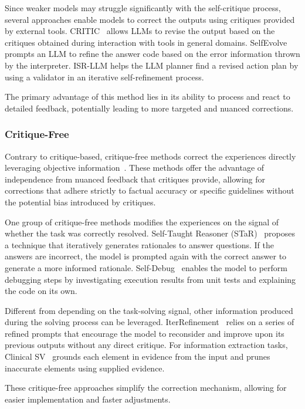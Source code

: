 \documentclass[sn-basic, Numbered]{sn-jnl}%
\theoremstyle{thmstyleone}%
\theoremstyle{thmstyletwo}%
\theoremstyle{thmstylethree}%
\begin{document}
Since weaker models may struggle significantly with the self-critique process, several approaches enable models to correct the outputs using critiques provided by external tools. CRITIC~\cite{gou2023critic} allows LLMs to revise the output based on the critiques obtained during interaction with tools in general domains. SelfEvolve~\cite{jiang2023selfevolve} prompts an LLM to refine the answer code based on the error information thrown by the interpreter. ISR-LLM \cite{zhou2023isr} helps the LLM planner find a revised action plan by using a validator in an iterative self-refinement process.

The primary advantage of this method lies in its ability to process and react to detailed feedback, potentially leading to more targeted and nuanced corrections. 

\subsubsection{Critique-Free}
Contrary to critique-based, critique-free methods correct the experiences directly leveraging objective information~\cite{zelikman2022star, chen2023teaching, chen2023iter, gero2023self}. These methods offer the advantage of independence from nuanced feedback that critiques provide, allowing for corrections that adhere strictly to factual accuracy or specific guidelines without the potential bias introduced by critiques. 

One group of critique-free methods modifies the experiences on the signal of whether the task was correctly resolved. 
Self-Taught Reasoner (STaR)~\cite{zelikman2022star} proposes a technique that iteratively generates rationales to answer questions. If the answers are incorrect, the model is prompted again with the correct answer to generate a more informed rationale. Self-Debug~\cite{chen2023teaching} enables the model to perform debugging steps by investigating execution results from unit tests and explaining the code on its own.

Different from depending on the task-solving signal, other information produced during the solving process can be leveraged. IterRefinement~\cite{chen2023iter} relies on a series of refined prompts that encourage the model to reconsider and improve upon its previous outputs without any direct critique. For information extraction tasks, Clinical SV~\cite{gero2023self} grounds each element in evidence from the input and prunes inaccurate elements using supplied evidence.

These critique-free approaches simplify the correction mechanism, allowing for easier implementation and faster adjustments. 
\end{document}
